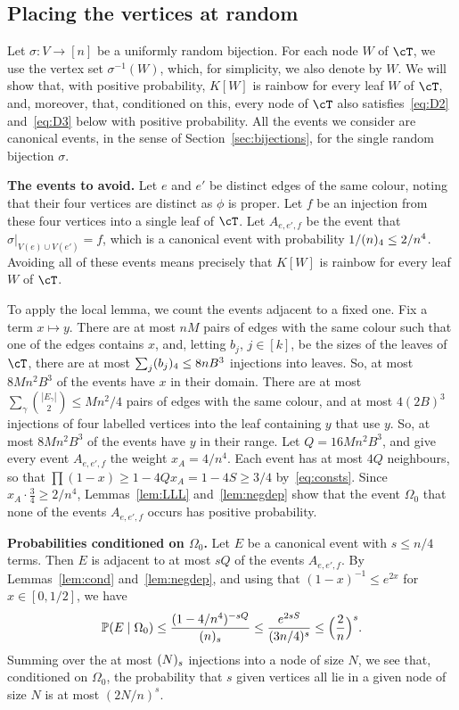 \subsection{Placing the vertices at random}\label{sec:placing}
Let $\sigma:V\to[n]$ be a uniformly random bijection. For each node $W$ of $\cT$, we use the vertex set $\sigma^{-1}(W)$, which, for simplicity, we also denote by $W$.
We will show that, with positive probability, $K[W]$ is rainbow for every leaf $W$ of $\cT$, and, moreover, that, conditioned on this, every node of $\cT$ also satisfies~\eqref{eq:D2} and~\eqref{eq:D3} below with positive probability.
All the events we consider are canonical events, in the sense of Section~\ref{sec:bijections}, for the single random bijection $\sigma$.

\smallskip

\noindent\textbf{The events to avoid.}
Let $e$ and $e'$ be distinct edges of the same colour, noting that their four vertices are distinct as $\phi$ is proper. Let $f$ be an injection from these four vertices into a single leaf of $\cT$. Let $A_{e,e',f}$ be the event that $\sigma|_{V(e)\cup V(e')}=f$, which is a canonical event with probability $1/(n)_{4}\le2/n^4$.
Avoiding all of these events means precisely that $K[W]$ is rainbow for every leaf $W$ of $\cT$.

To apply the local lemma, we count the events adjacent to a fixed one. Fix a term $x\mapsto y$. There are at most $nM$ pairs of edges with the same colour such that one of the edges contains $x$, and, letting $b_j$, $j\in [k]$, be the sizes of the leaves of $\cT$, there are at most $\sum_j(b_j)_{4}\le8nB^3$ injections into leaves. So, at most $8Mn^2B^3$ of the events have $x$ in their domain.
There are at most $\sum_\gamma\binom{|E_\gamma|}2\le Mn^2/4$ pairs of edges with the same colour, and at most $4(2B)^3$ injections of four labelled vertices into the leaf containing $y$ that use $y$. So, at most $8Mn^2B^3$ of the events have $y$ in their range.
Let $Q=16Mn^2B^3$, and give every event $A_{e,e',f}$ the weight $x_A=4/n^4$. Each event has at most $4Q$ neighbours, so that $\prod(1-x)\ge1-4Qx_A=1-4S\ge3/4$ by~\eqref{eq:consts}. Since $x_A\cdot\frac34\ge2/n^4$, Lemmas~\ref{lem:LLL} and~\ref{lem:negdep} show that the event $\Omega_0$ that none of the events $A_{e,e',f}$ occurs has positive probability.

\smallskip

\noindent\textbf{Probabilities conditioned on $\Omega_0$.}
Let $E$ be a canonical event with $s\le n/4$ terms. Then $E$ is adjacent to at most $sQ$ of the events $A_{e,e',f}$. By Lemmas~\ref{lem:cond} and~\ref{lem:negdep}, and using that $(1-x)^{-1}\le e^{2x}$ for $x\in [0,1/2]$, we have
\begin{equation}\label{eq:condprob}
\mathbb{P}(E\mid\Omega_0)\le\frac{(1-4/n^4)^{-sQ}}{(n)_{s}}\le\frac{e^{2sS}}{(3n/4)^s}\le\Bigl(\frac2n\Bigr)^s.
\end{equation}
Summing over the at most $(N)_{s}$ injections into a node of size $N$, we see that, conditioned on $\Omega_0$, the probability that $s$ given vertices all lie in a given node of size $N$ is at most $(2N/n)^s$.

